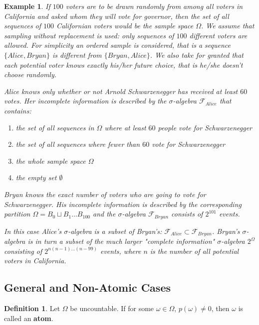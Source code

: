 \documentclass{article}
\newtheorem{example}{Example}[section]
\theoremstyle{remark}
\theoremstyle{definition}
\newtheorem{definition}{Definition}[section]
\begin{document}
\begin{example}
If $100$ voters are to be drawn randomly from among all voters in California and asked whom they will vote for governor, then the set of all sequences of $100$ Californian voters would be the sample space $\Omega$. We assume that sampling without replacement is used: only sequences of $100$ different voters are allowed. For simplicity an ordered sample is considered, that is a sequence $\{Alice, Bryan\}$ is different from $\{Bryan, Alice\}$. We also take for granted that each potential voter knows exactly his/her future choice, that is he/she doesn’t choose randomly.

Alice knows only whether or not Arnold Schwarzenegger has received at least $60$ votes. Her incomplete information is described by the $\sigma$-algebra $\mathcal{F}_{Alice}$ that contains:
\begin{enumerate}
    \item the set of all sequences in $\Omega$ where at least $60$ people vote for Schwarzenegger
    \item the set of all sequences where fewer than $60$ vote for Schwarzenegger
    \item the whole sample space $\Omega$
    \item the empty set $\emptyset$
\end{enumerate}
Bryan knows the exact number of voters who are going to vote for Schwarzenegger. His incomplete information is described by the corresponding partition $\Omega = B_0 \sqcup B_1 \ldots B_{100}$ and the $\sigma$-algebra $\mathcal{F}_{Bryan}$ consists of $2^{101}$ events. 

In this case Alice’s $\sigma$-algebra is a subset of Bryan’s: $\mathcal{F}_{Alice} \subset \mathcal{F}_{Bryan}$. Bryan’s $\sigma$-algebra is in turn a subset of the much larger "complete information" $\sigma$-algebra $2^{\Omega}$ consisting of $2^{n(n-1)\ldots (n-99)}$ events, where $n$ is the number of all potential voters in California. 
\end{example}

\subsection{General and Non-Atomic Cases}

\begin{definition}
Let $\Omega$ be uncountable. If for some $\omega \in \Omega$, $p(\omega) \neq 0$, then $\omega$ is called an \textbf{atom}. 
\end{definition}
\end{document}
